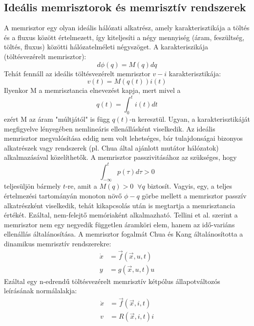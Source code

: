 \documentclass[twoside]{article}
\begin{document}
\subsection{Ideális memrisztorok és memrisztív rendszerek}
A memrisztor egy olyan ideális hálózati alkatrész, amely karakterisztikája a töltés és a fluxus között értelmezett, így kiteljesíti a négy mennyiség (áram, feszültség, töltés, fluxus) közötti hálózatelméleti négyszöget.\cite{chua} A karakteriszikája (töltésvezérelt memrisztor): 
\begin{equation}\label{karakter}
	d\phi(q) = M(q)dq 
\end{equation}
Tehát fennáll az ideális töltésvezérelt memrisztor $v-i$ karakterisztikája: 
\begin{equation}
	v(t) = M(q(t))i(t)
\end{equation}
Ilyenkor M a memrisztancia elnevezést kapja, mert mivel a 
\begin{equation}
	q(t) = \int_{0}^{t} i(t)dt
\end{equation} ezért M az áram "múltjától" is függ $q(t)$-n keresztül. Ugyan, a karakterisztikáját megfigyelve lényegében nemlineáris ellenállásként viselkedik. Az ideális memrisztor megvalósítása eddig nem volt lehetséges, bár tulajdonságai bizonyos alkatrészek vagy rendszerek (pl.  Chua által ajánlott mutátor hálózatok) alkalmazásával közelíthetők. A memrisztor passzivitásához az szükséges, hogy 
\begin{equation}
	\int_{-\infty}^{t} p(\tau)d\tau > 0
\end{equation} teljesüljön bármely $t$-re, amit a $M(q) > 0 \;\; \forall q$ biztosít. Vagyis, egy, a teljes értelmezési tartományán monoton növő $\phi-q$ görbe mellett a memrisztor passzív alkatrészként viselkedik, tehát kikapcsolás után is megtartja a memrisztancia értékét. Ezáltal, nem-felejtő memóriaként alkalmazható. Tellini et al. szerint \cite{tellini2021} a memrisztor nem egy negyedik független áramköri elem, hanem az idő-variáns ellenállás általánosítása. A memrisztor fogalmát Chua és Kang általánosította a dinamikus memrisztív rendszerekre\cite{chuakang1976}: 
\begin{equation}
	\begin{aligned}
		\dot{x} &= \vec{f}(\vec{x}, u, t) \\ y &= g(\vec{x}, u, t)u \label{eq:allapot} 
	\end{aligned}
\end{equation} 
Ezáltal egy n-edrendű töltésvezérelt memrisztív kétpólus állapotváltozós leírásának normálalakja:
\begin{equation}
	\begin{aligned}
		\dot{x} &= \vec{f}(\vec{x}, i, t) \\
		v &= R(\vec{x}, i, t)i
	\end{aligned}
\end{equation}
\end{document}
